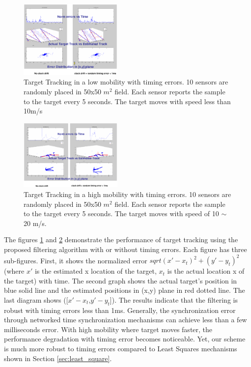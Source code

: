  \begin{figure}
    \begin{center}

    \includegraphics[height=0.45\textheight,width=0.45\textwidth,bbllx=38,bblly=254,bburx=510,bbury=605]{figures/estimationlow}
    \caption{Target Tracking in a low mobility with timing errors. 10 sensors are randomly placed in 50x50 $m^2$ field. Each sensor reports the sample to the target every 5 seconds. The target moves with speed less than 10m/s}
        \label{fig:estimation_low}
    \end{center}
\end{figure}

\begin{figure}
    \begin{center}

    \includegraphics[height=0.45\textheight,width=0.45\textwidth,bbllx=51,bblly=262,bburx=588,bbury=615]{figures/estimationhigh}
    \caption{Target Tracking in a high mobility with timing errors. 10 sensors are randomly placed in 50x50 $m^2$ field. Each sensor reports the sample to the target every 5 seconds. The target moves with speed of 10 $\sim$ 20 m/s. }
        \label{fig:estimation_high}
    \end{center}
\end{figure}

The figures \ref{fig:estimation_low} and \ref{fig:estimation_high}
demonstrate the performance of target tracking using the proposed
filtering algorithm with or without timing errors. Each figure has
three sub-figures. First, it shows the normalized error
$sqrt{(x'-x_t)^2+(y'-y_t)^2}$ (where $x'$ is the estimated x
location of the target, $x_t$ is the actual location x of the
target) with time. The second graph shows the actual target's
position in blue solid line and the estimated positions in (x,y)
plane in red dotted line. The last diagram shows
([$x'-x_t$,$y'-y_t$]). The results indicate that the filtering is
robust with timing errors less than 1ms. Generally, the
synchronization error through networked time synchronization
mechanisms can achieve less than a few milliseconds error. With high
mobility where target moves faster, the performance degradation with
timing error becomes noticeable. Yet, our scheme is much more robust
to timing errors compared to Least Squares mechanisms shown in
Section \ref{sec:least_square}.
